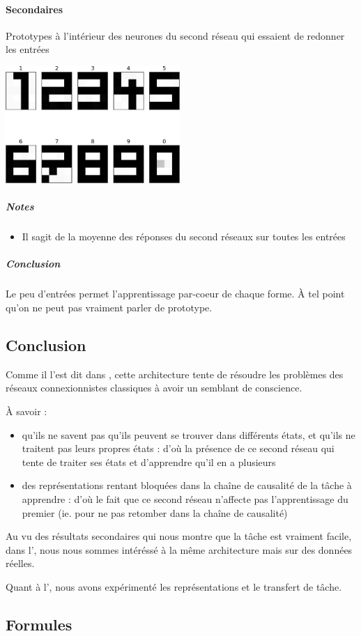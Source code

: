     \paragraph{Secondaires}
      Prototypes à l'intérieur des neurones du second réseau qui essaient de redonner les entrées
      \begin{center}
	\includegraphics[width=250px]{data/expA1/prototype.png}
      \end{center} 
      \subparagraph{Notes}
	\begin{itemize}
	  \item Il sagit de la moyenne des réponses du second réseaux sur toutes les entrées
	\end{itemize}
      \subparagraph{Conclusion}
	Le peu d'entrées permet l'apprentissage par-coeur de chaque forme. À tel point qu'on ne peut pas vraiment
	parler de prototype.
	
  \subsection{Conclusion}
  Comme il l'est dit dans \cite{Cleeremans_2007}, cette architecture tente de résoudre les problèmes des réseaux connexionnistes
  classiques à avoir un semblant de conscience.
  
  À savoir :
  \begin{itemize}
   \item qu'ils ne savent pas qu'ils peuvent se trouver dans différents états, et qu'ils ne traitent pas leurs propres états : 
   d'où la présence de ce second réseau qui tente de traiter ses états et d'apprendre qu'il en a plusieurs
   \item des représentations rentant bloquées dans la chaîne de causalité de la tâche à apprendre : d'où
   le fait que ce second réseau n'affecte pas l'apprentissage du premier (ie. pour ne pas retomber dans la chaîne de causalité)
   \\[0.2cm]
  \end{itemize}
  
  Au vu des résultats secondaires qui nous montre que la tâche est vraiment facile, dans l',
  nous nous sommes intéréssé à la même architecture mais sur des données réelles.
  
  Quant à l', nous avons expérimenté les représentations et le transfert de tâche.

  \newpage 
  \subsection{Formules}
    
    
    
    


